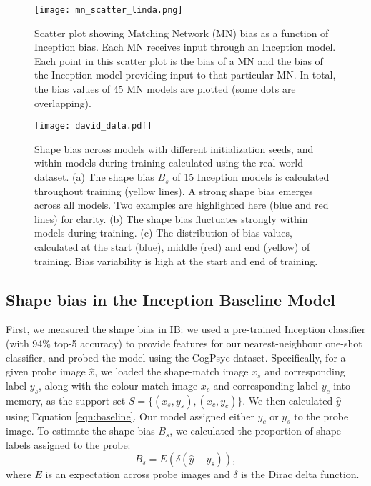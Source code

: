 \documentclass{article}
\begin{document}
\begin{figure}[h]
\begin{center}
\centerline{\texttt{[image: mn\_scatter\_linda.png]}}
\caption{Scatter plot showing Matching Network (MN) bias as a function of Inception bias. Each MN receives input through an Inception model. Each point in this scatter plot is the bias of a MN and the bias of the Inception model providing input to that particular MN. In total, the bias values of 45 MN models are plotted (some dots are overlapping).}
\label{fig:mn_scatter}
\end{center}
\vskip -0.2in
\end{figure}\begin{figure*}[ht]
\begin{center}
\centerline{\texttt{[image: david\_data.pdf]}}
\caption{Shape bias across models with different initialization seeds, and within models during training calculated using the real-world dataset. (a) The shape bias $B_s$ of 15 Inception models is calculated throughout training (yellow lines). A strong shape bias emerges across all models. Two examples are highlighted here (blue and red lines) for clarity. (b) The shape bias fluctuates strongly within models during training. (c) The distribution of bias values, calculated at the start (blue), middle (red) and end (yellow) of training. Bias variability is high at the start and end of training. }
\label{fig:statistics_MN}
\end{center}
\vskip -0.2in
\end{figure*}\subsection{Shape bias in the Inception Baseline Model}

First, we measured the shape bias in IB: we used a pre-trained Inception classifier (with 94\% top-5 accuracy) to provide features for our nearest-neighbour one-shot classifier, and probed the model using the CogPsyc dataset. Specifically, for a given probe image $\hat{x}$, we loaded the shape-match image $x_s$ and corresponding label $y_s$, along with the colour-match image $x_c$ and corresponding label $y_c$ into memory, as the support set $S = \{(x_s,y_s),(x_c,y_c)\}$. We then calculated $\hat{y}$ using Equation \ref{eqn:baseline}. Our model assigned either $y_c$ or $y_s$ to the probe image. To estimate the shape bias $B_s$, we calculated the proportion of shape labels assigned to the probe:
\begin{equation}
    B_s = \displaystyle{E(\delta(\hat{y} - y_s))},
\end{equation}
where $E$ is an expectation across probe images and $\delta$ is the Dirac delta function.
\end{document}
